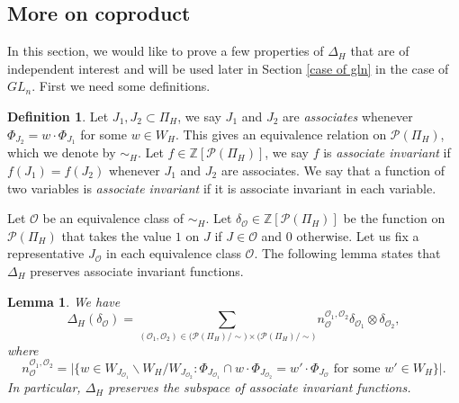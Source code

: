 \documentclass{amsart}
\theoremstyle{plain}
\newtheorem{lemma}[theorem]{Lemma}
\theoremstyle{definition}
\newtheorem{definition}{Definition}
\theoremstyle{remark}
\begin{document}
\subsection{More on coproduct} 
In this section, we would like to prove a few properties of $\Delta_H$ that are of independent interest and will be used later in Section \ref{case of gln} in the case of $GL_n$. First we need some definitions.
\begin{definition}
Let $J_{1}, J_{2} \subset \Pi_H$, we say $J_{1}$ and $J_{2}$ are \emph{associates} whenever $\Phi_{J_{2}}=w\cdot \Phi_{J_{1}}$ for some $w\in W_H$. This gives an equivalence relation on $\mathcal{P}(\Pi_{H})$, which we denote by $\sim_H$. Let $f\in\mathbb{Z}[\mathcal{P}(\Pi_{H})]$, we say $f$ is \emph{associate invariant} if $f(J_{1})=f(J_{2})$ whenever $J_{1}$ and $J_{2}$ are associates. We say that a function of two variables is \emph{associate invariant} if it is associate invariant in each variable.
\end{definition}
Let $\mathcal{O}$ be an equivalence class of $\sim_{H}$.
Let $\delta_{\mathcal{O}}\in\mathbb{Z}[\mathcal{P}(\Pi_{H})]$ be the function on $\mathcal{P}(\Pi_{H})$ that takes the value $1$ on $J$ if $J\in\mathcal{O}$ and $0$ otherwise. Let us fix a representative $J_{\mathcal{O}}$ in each equivalence class $\mathcal{O}$. 
The following lemma states that $\Delta_{H}$ preserves associate invariant functions.
\begin{lemma}\label{associateinvariantdelta}
We have
\begin{equation}\label{lhsrhs}
\Delta_{H}(\delta_{\mathcal{O}})=\sum_{(\mathcal{O}_{1},\mathcal{O}_{2})\in\big(\mathcal{P}(\Pi_{H})/\sim\big)\times\big(\mathcal{P}(\Pi_{H})/\sim\big)}n_{\mathcal{O}}^{\mathcal{O}_{1},\mathcal{O}_{2}}\delta_{\mathcal{O}_{1}}\otimes \delta_{\mathcal{O}_{2}},
\end{equation}
where
\[
n_{\mathcal{O}}^{\mathcal{O}_{1},\mathcal{O}_{2}}
=
\big|\{w\in W_{J_{\mathcal{O}_{1}}}\backslash W_{H}/W_{J_{\mathcal{O}_{2}}}:\Phi_{J_{\mathcal{O}_{1}}}\cap w\cdot \Phi_{J_{\mathcal{O}_{2}}}=
w'\cdot\Phi_{J_{\mathcal{O}}}\text{ for some }w'\in W_H\}\big|.
\]
In particular, $\Delta_H$ preserves the subspace of associate invariant functions.
\end{lemma}
\end{document}
